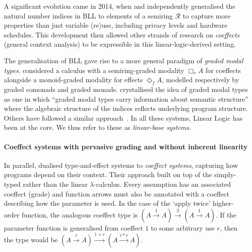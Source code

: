 A significant evolution came in 2014, when \citet{brunel2014core} and \citet{ghica2014bounded}
independently generalised the natural number indices in BLL to
elements of a semiring $\mathcal{R}$ to capture more properties than
just variable (re)use, including privacy levels and hardware schedules.
This development then allowed other strands of research on \emph{coeffects} (general
context analysis) to be expressible in this linear-logic-derived setting.

The generalisation of BLL gave rise to a more general paradigm
of \emph{graded modal types}. \citet{DBLP:conf/icfp/GaboardiKOBU16} considered a calculus
with a semiring-graded modality $\Box_r A$ for coeffects alongside a
monoid-graded modality for effects $\Diamond_f A$, modelled
respectively by graded comonads and graded
monads.  \citet{DBLP:journals/pacmpl/OrchardLE19} crystallised the idea of
graded modal types as one in which ``graded modal types carry
information about semantic structure'' where the algebraic structure
of the indices reflects underlying program
structure. Others
have followed a similar approach~\cite{wood2020linear,DBLP:conf/esop/WoodA22,DBLP:journals/corr/abs-2112-14966,DBLP:conf/lopstr/HughesO20}.
In all these systems, Linear Logic has been at the core. We thus refer to
these as \emph{linear-base systems}.

\paragraph{Coeffect systems with pervasive grading and without inherent linearity}
In parallel, \citet{DBLP:conf/icalp/PetricekOM13,petricek2014coeffects} dualised type-and-effect
systems to \emph{coeffect systems}, capturing how programs depend on their
context.
Their approach built on top of the simply-typed
rather than the linear $\lambda$-calculus. Every assumption
has an associated coeffect (grade) and function arrows must also
be annotated with a coeffect describing how the parameter is used.
In the case of the `apply twice' higher-order function,
the analogous coeffect type is $(A \xrightarrow{1} A) \xrightarrow{2} (A
\xrightarrow {1} A)$. If the parameter function
is generalised from coeffect $1$ to
some arbitrary use $r$, then the type would be
$(A \xrightarrow{r} A) \xrightarrow{1 + r} (A \xrightarrow {r * r} A)$.

